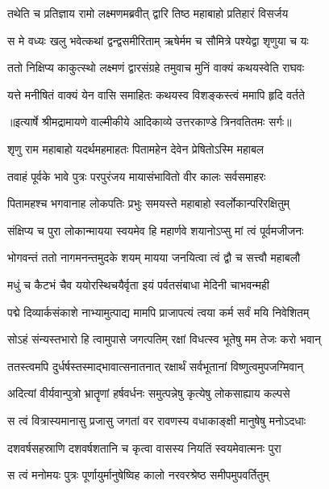 \twolineshloka
{तथेति च प्रतिज्ञाय रामो लक्ष्मणमब्रवीत्}
{द्वारि तिष्ठ महाबाहो प्रतिहारं विसर्जय} %

\twolineshloka
{स मे वध्यः खलु भवेत्कथां द्वन्द्वसमीरिताम्}
{ऋषेर्मम च सौमित्रे पश्येद्वा शृणुया च यः} %

\twolineshloka
{ततो निक्षिप्य काकुत्स्थो लक्ष्मणं द्वारसंग्रहे}
{तमुवाच मुनिं वाक्यं कथयस्वेति राघवः} %

\twolineshloka
{यत्ते मनीषितं वाक्यं येन वासि समाहितः}
{कथयस्व विशङ्कस्त्वं ममापि हृदि वर्तते} %


{॥इत्यार्षे श्रीमद्रामायणे वाल्मीकीये आदिकाव्ये उत्तरकाण्डे त्रिनवतितमः सर्गः॥}


\twolineshloka
{शृणु राम महाबाहो यदर्थमहमाहतः}
{पितामहेन देवेन प्रेषितोऽस्मि महाबल} %

\twolineshloka
{तवाहं पूर्वके भावे पुत्रः परपुरंजय}
{मायासंभावितो वीर कालः सर्वसमाहरः} %

\twolineshloka
{पितामहश्च भगवानाह लोकपतिः प्रभुः}
{समयस्ते महाबाहो स्वर्लोकान्परिरक्षितुम्} %

\twolineshloka
{संक्षिप्य च पुरा लोकान्मायया स्वयमेव हि}
{महार्णवे शयानोऽप्सु मां त्वं पूर्वमजीजनः} %

\twolineshloka
{भोगवन्तं ततो नागमनन्तमुदके शयम्}
{मायया जनयित्वा त्वं द्वौ च सत्त्वौ महाबलौ} %

\twolineshloka
{मधुं च कैटभं चैव ययोरस्थिचयैर्वृता}
{इयं पर्वतसंबाधा मेदिनी चाभवन्मही} %

\twolineshloka
{पद्मे दिव्यार्कसंकाशे नाभ्यामुत्पाद्य मामपि}
{प्राजापत्यं त्वया कर्म सर्वं मयि निवेशितम्} %

\twolineshloka
{सोऽहं संन्यस्तभारो हि त्वामुपासे जगत्पतिम्}
{रक्षां विधत्स्व भूतेषु मम तेजः करो भवान्} %

\twolineshloka
{ततस्त्वमपि दुर्धर्षस्तस्माद्भावात्सनातनात्}
{रक्षार्थं सर्वभूतानां विष्णुत्वमुपजग्मिवान्} %

\twolineshloka
{अदित्यां वीर्यवान्पुत्रो भ्रातॄणां हर्षवर्धनः}
{समुत्पन्नेषु कृत्येषु लोकसाह्याय कल्पसे} %

\twolineshloka
{स त्वं वित्रास्यमानासु प्रजासु जगतां वर}
{रावणस्य वधाकाङ्क्षी मानुषेषु मनोऽदधाः} %

\twolineshloka
{दशवर्षसहस्राणि दशवर्षशतानि च}
{कृत्वा वासस्य नियतिं स्वयमेवात्मनः पुरा} %

\twolineshloka
{स त्वं मनोमयः पुत्रः पूर्णायुर्मानुषेष्विह}
{कालो नरवरश्रेष्ठ समीपमुपवर्तितुम्} %

